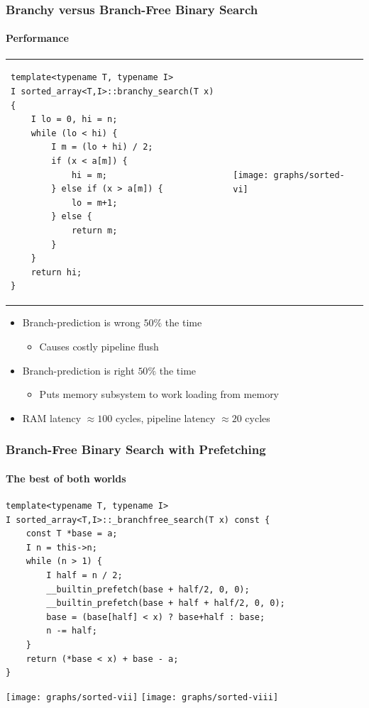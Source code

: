 \documentclass[xcolor=dvipsnames]{beamer}
\begin{document}
\begin{frame}[fragile]
   \frametitle{Branchy versus Branch-Free Binary Search}
   \framesubtitle{Performance}

   \begin{tabular}{m{}m{}}
\tiny
 \begin{verbatim}
template<typename T, typename I>
I sorted_array<T,I>::branchy_search(T x) {
    I lo = 0, hi = n;
    while (lo < hi) {
        I m = (lo + hi) / 2;
        if (x < a[m]) {
            hi = m;
        } else if (x > a[m]) {
            lo = m+1;
        } else {
            return m;
        }
    }
    return hi;
}
\end{verbatim}
&
     \texttt{[image: graphs/sorted-vi]}
\end{tabular}
\begin{itemize}
  \item<+-> Branch-prediction is wrong $50\%$ the time
     \begin{itemize}
       \item<+-> Causes costly pipeline flush
     \end{itemize}
  \item<+-> Branch-prediction is right $50\%$ the time
      \begin{itemize}
       \item<+-> Puts memory subsystem to work loading from memory
     \end{itemize}
  \item<+->RAM latency $\approx100$ cycles, pipeline latency $\approx 20$ cycles
\end{itemize}
\end{frame}

\begin{frame}[fragile]
   \frametitle{Branch-Free Binary Search with Prefetching}
   \framesubtitle{The best of both worlds}

   {\tiny
   \begin{verbatim}
template<typename T, typename I>
I sorted_array<T,I>::_branchfree_search(T x) const {
    const T *base = a;
    I n = this->n;
    while (n > 1) {
        I half = n / 2;
        __builtin_prefetch(base + half/2, 0, 0);
        __builtin_prefetch(base + half + half/2, 0, 0);
        base = (base[half] < x) ? base+half : base;
        n -= half;
    }
    return (*base < x) + base - a;
}
   \end{verbatim}
   }
   \texttt{[image: graphs/sorted-vii]}
   \texttt{[image: graphs/sorted-viii]}

\end{frame}
\end{document}

